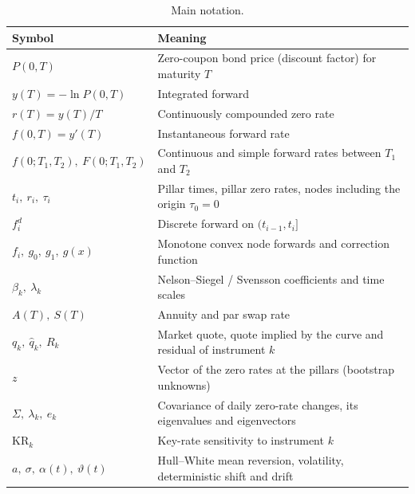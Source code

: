 \documentclass[11pt,a4paper]{article}
\theoremstyle{plain}
\theoremstyle{definition}
\begin{document}
\begin{table}[h]
\centering
\begin{tabular}{@{}lp{11.5cm}@{}}
\toprule
Symbol & Meaning \\
\midrule
$P(0,T)$ & Zero-coupon bond price (discount factor) for maturity $T$ \\
$y(T)=-\ln P(0,T)$ & Integrated forward \\
$r(T)=y(T)/T$ & Continuously compounded zero rate \\
$f(0,T)=y'(T)$ & Instantaneous forward rate \\
$f(0;T_1,T_2),\ F(0;T_1,T_2)$ & Continuous and simple forward rates between $T_1$ and $T_2$ \\
$t_i,\ r_i,\ \tau_i$ & Pillar times, pillar zero rates, nodes including the origin $\tau_0=0$ \\
$f^d_i$ & Discrete forward on $(t_{i-1},t_i]$ \\
$f_i,\ g_0,\ g_1,\ g(x)$ & Monotone convex node forwards and correction function \\
$\beta_k,\ \lambda_k$ & Nelson--Siegel / Svensson coefficients and time scales \\
$A(T),\ S(T)$ & Annuity and par swap rate \\
$q_k,\ \hat q_k,\ R_k$ & Market quote, quote implied by the curve and residual of instrument $k$ \\
$z$ & Vector of the zero rates at the pillars (bootstrap unknowns) \\
$\Sigma,\ \lambda_k,\ e_k$ & Covariance of daily zero-rate changes, its eigenvalues and eigenvectors \\
$\mathrm{KR}_k$ & Key-rate sensitivity to instrument $k$ \\
$a,\ \sigma,\ \alpha(t),\ \vartheta(t)$ & Hull--White mean reversion, volatility, deterministic shift and drift \\
\bottomrule
\end{tabular}
\caption{Main notation.}
\label{tab:notation}
\end{table}

\clearpage
\end{document}
